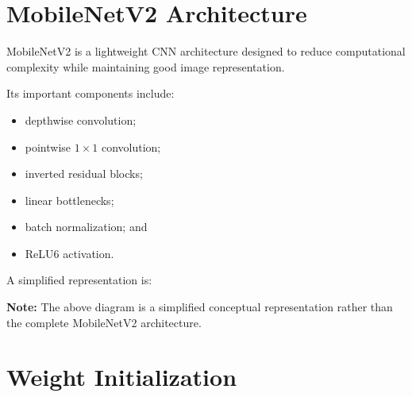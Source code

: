 \documentclass[10pt]{article}
\begin{document}
\section{MobileNetV2 Architecture}

MobileNetV2 is a lightweight CNN architecture designed to reduce
computational complexity while maintaining good image representation.

Its important components include:

\begin{itemize}
\item depthwise convolution;
\item pointwise $1\times1$ convolution;
\item inverted residual blocks;
\item linear bottlenecks;
\item batch normalization; and
\item ReLU6 activation.
\end{itemize}

A simplified representation is:

\begin{center}
\end{center}

\textbf{Note:} The above diagram is a simplified conceptual representation
rather than the complete MobileNetV2 architecture.

\section{Weight Initialization}
\end{document}
